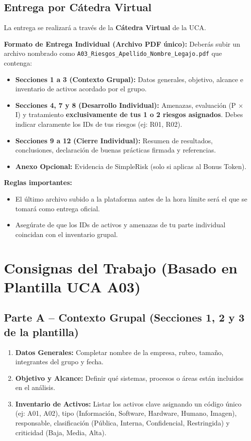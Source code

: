 \documentclass[11pt,a4paper]{article}
\begin{document}
\subsection{Entrega por Cátedra Virtual}
La entrega se realizará a través de la \textbf{Cátedra Virtual} de la UCA.

\begin{infobox}
\textbf{Formato de Entrega Individual (Archivo PDF único):}
Deberás subir un archivo nombrado como \texttt{A03\_Riesgos\_Apellido\_Nombre\_Legajo.pdf} que contenga:
\begin{itemize}
    \item \textbf{Secciones 1 a 3 (Contexto Grupal):} Datos generales, objetivo, alcance e inventario de activos acordado por el grupo.
    \item \textbf{Secciones 4, 7 y 8 (Desarrollo Individual):} Amenazas, evaluación (P $\times$ I) y tratamiento \textbf{exclusivamente de tus 1 o 2 riesgos asignados}. Debes indicar claramente los IDs de tus riesgos (ej: R01, R02).
    \item \textbf{Secciones 9 a 12 (Cierre Individual):} Resumen de resultados, conclusiones, declaración de buenas prácticas firmada y referencias.
    \item \textbf{Anexo Opcional:} Evidencia de SimpleRisk (solo si aplicas al Bonus Token).
\end{itemize}
\end{infobox}

\textbf{Reglas importantes:}
\begin{itemize}
    \item El último archivo subido a la plataforma antes de la hora límite será el que se tomará como entrega oficial.
    \item Asegúrate de que los IDs de activos y amenazas de tu parte individual coincidan con el inventario grupal.
\end{itemize}

\section{Consignas del Trabajo (Basado en Plantilla UCA A03)}

\subsection{Parte A -- Contexto Grupal (Secciones 1, 2 y 3 de la plantilla)}
\begin{enumerate}
    \item \textbf{Datos Generales:} Completar nombre de la empresa, rubro, tamaño, integrantes del grupo y fecha.
    \item \textbf{Objetivo y Alcance:} Definir qué sistemas, procesos o áreas están incluidos en el análisis.
    \item \textbf{Inventario de Activos:} Listar los activos clave asignando un código único (ej: A01, A02), tipo (Información, Software, Hardware, Humano, Imagen), responsable, clasificación (Pública, Interna, Confidencial, Restringida) y criticidad (Baja, Media, Alta).
\end{enumerate}
\end{document}
